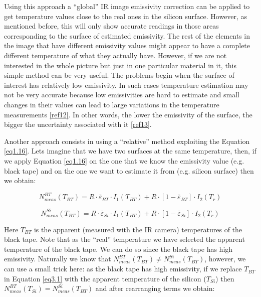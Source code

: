 		Using this approach a “global” IR image emissivity correction can be applied to get temperature values close to the real ones in the silicon surface. However, as mentioned before, this will only show accurate readings in those areas corresponding to the surface of estimated emissivity. The rest of the elements in the image that have different emissivity values might appear to have a complete different temperature of what they actually have. However, if we are not interested in the whole picture but just in one particular material in it, this simple method can be very useful. The problems begin when the surface of interest has relatively low emissivity. In such cases temperature estimation may not be very accurate because low emissivities are hard to estimate and small changes in their values can lead to large variations in the temperature measurements \ref{ref12}. In other words, the lower the emissivity of the surface, the bigger the uncertainty associated with it \ref{ref13}.
		
		Another approach consists in using a “relative” method exploiting the Equation \ref{eq1.16}. Lets imagine that we have two surfaces at the same temperature, then, if we apply Equation \ref{eq1.16} on the one that we know the emissivity value (e.g. black tape) and on the one we want to estimate it from (e.g. silicon surface) then we obtain:
		
		\begin{equation}\label{eq3.1}
			N^{BT}_{meas}(T_{BT})= R \cdot \bar{\varepsilon}_{BT} \cdot I_{1}(T_{BT}) + R \cdot [1- \bar{\varepsilon}_{BT}] \cdot I_{2}(T_{r})
		\end{equation}
			
		\begin{equation}\label{eq3.2}
			N^{Si}_{meas}(T_{BT})= R \cdot \bar{\varepsilon}_{Si} \cdot I_{1}(T_{BT}) + R \cdot [1- \bar{\varepsilon}_{Si}] \cdot I_{2}(T_{r})
		\end{equation}\bigskip
	
		Here $T_{BT}$ is the apparent (measured with the IR camera) temperatures of the black tape. Note that as the “real” temperature we have selected the apparent temperature of the black tape. We can do so since the black tape has high emissivity. Naturally we know that $N^{BT}_{meas}(T_{BT}) \neq N^{Si}_{meas}(T_{BT})$, however, we can use a small trick here: as the black tape has high emissivity, if we replace $T_{BT}$ in Equation \ref{eq3.1} with the apparent temperature of the silicon ($T_{Si}$) then $N^{BT}_{meas}(T_{Si}) = N^{Si}_{meas}(T_{BT})$ and after rearranging terms we obtain:
		
